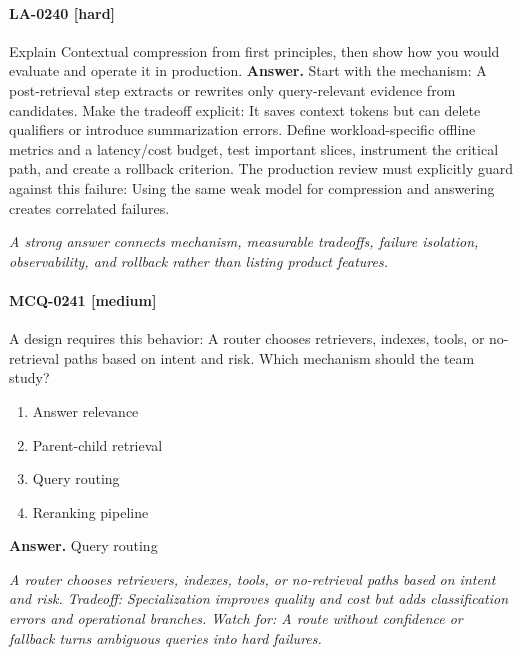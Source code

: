 \paragraph{LA-0240 [hard]} Explain Contextual compression from first principles, then show how you would evaluate and operate it in production.
\noindent\textbf{Answer.} Start with the mechanism: A post-retrieval step extracts or rewrites only query-relevant evidence from candidates. Make the tradeoff explicit: It saves context tokens but can delete qualifiers or introduce summarization errors. Define workload-specific offline metrics and a latency/cost budget, test important slices, instrument the critical path, and create a rollback criterion. The production review must explicitly guard against this failure: Using the same weak model for compression and answering creates correlated failures.
\par\textit{A strong answer connects mechanism, measurable tradeoffs, failure isolation, observability, and rollback rather than listing product features.}
\paragraph{MCQ-0241 [medium]} A design requires this behavior: A router chooses retrievers, indexes, tools, or no-retrieval paths based on intent and risk. Which mechanism should the team study?
\begin{enumerate}[label=\Alph*.]
\item Answer relevance
\item Parent-child retrieval
\item Query routing
\item Reranking pipeline
\end{enumerate}
\noindent\textbf{Answer.} Query routing
\par\textit{A router chooses retrievers, indexes, tools, or no-retrieval paths based on intent and risk. Tradeoff: Specialization improves quality and cost but adds classification errors and operational branches. Watch for: A route without confidence or fallback turns ambiguous queries into hard failures.}
